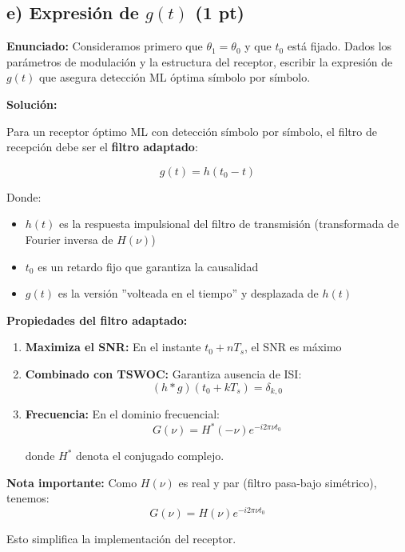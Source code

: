 \documentclass[11pt,a4paper]{article}
\begin{document}
\subsection*{e) Expresi\'on de $g(t)$ (1 pt)}

\textbf{Enunciado:} Consideramos primero que $\theta_1 = \theta_0$ y que $t_0$ est\'a fijado. Dados los par\'ametros de modulaci\'on y la estructura del receptor, escribir la expresi\'on de $g(t)$ que asegura detecci\'on ML \'optima s\'imbolo por s\'imbolo.

\vspace{0.3cm}
\textbf{Soluci\'on:}

Para un receptor \'optimo ML con detecci\'on s\'imbolo por s\'imbolo, el filtro de recepci\'on debe ser el \textbf{filtro adaptado}:

\[
\boxed{g(t) = h(t_0 - t)}
\]

Donde:
\begin{itemize}
    \item $h(t)$ es la respuesta impulsional del filtro de transmisi\'on (transformada de Fourier inversa de $H(\nu)$)
    \item $t_0$ es un retardo fijo que garantiza la causalidad
    \item $g(t)$ es la versi\'on ''volteada en el tiempo'' y desplazada de $h(t)$
\end{itemize}

\textbf{Propiedades del filtro adaptado:}

\begin{enumerate}
    \item \textbf{Maximiza el SNR:} En el instante $t_0 + nT_s$, el SNR es m\'aximo
    
    \item \textbf{Combinado con TSWOC:} Garantiza ausencia de ISI:
    \[
    (h * g)(t_0 + kT_s) = \delta_{k,0}
    \]
    
    \item \textbf{Frecuencia:} En el dominio frecuencial:
    \[
    G(\nu) = H^*(−\nu) e^{-i2\pi\nu t_0}
    \]
    
    donde $H^*$ denota el conjugado complejo.
\end{enumerate}

\textbf{Nota importante:} Como $H(\nu)$ es real y par (filtro pasa-bajo sim\'etrico), tenemos:
\[
G(\nu) = H(\nu) e^{-i2\pi\nu t_0}
\]

Esto simplifica la implementaci\'on del receptor.
\end{document}
